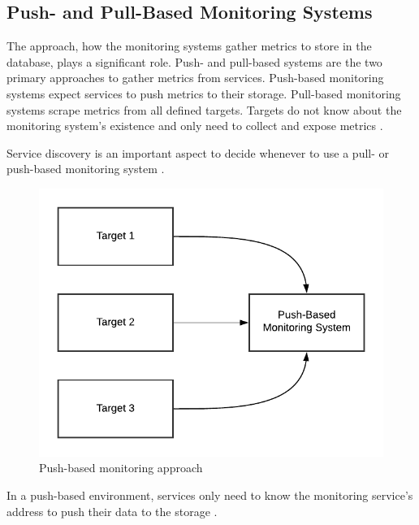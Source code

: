 \subsection{Push- and Pull-Based Monitoring Systems}
\label{subsec:02_monitoring_push-pull}
The approach, how the monitoring systems gather metrics to store in the database, plays a significant role.
Push- and pull-based systems are the two primary approaches to gather metrics from services.
Push-based monitoring systems expect services to push metrics to their storage.
Pull-based monitoring systems scrape metrics from all defined targets. Targets do not know about the monitoring system's existence and only need to collect and expose metrics \cite{Farcic2017Toolkit21}.


Service discovery is an important aspect to decide whenever to use a pull- or push-based monitoring system \cite{Farcic2017Toolkit21}.

\begin{figure}[h]
\centering
\includegraphics[scale=0.8]{images/02_theoretical_foundation/monitoring/push_based}
\caption{Push-based monitoring approach}
\label{fig:mon_push-based}
\end{figure}
In a push-based environment, services only need to know the monitoring service's address to push their data to the storage \cite{Farcic2017Toolkit21}.


